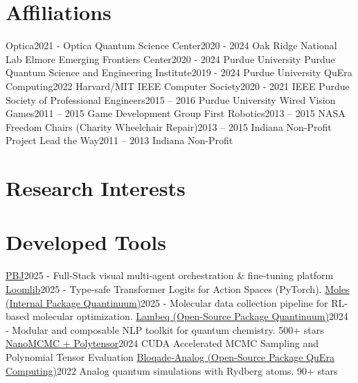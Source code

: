 \section{Affiliations}
  \resumeSubHeadingListStart
    \resumeSubheading
      {Optica}{2021 -}
      {Optica}{}
    \resumeSubheading
      {Quantum Science Center}{2020 - 2024}
      {Oak Ridge National Lab}{}
    \resumeSubheading
      {Elmore Emerging Frontiers Center}{2020 - 2024}
      {Purdue University}{}
    \resumeSubheading
      {Purdue Quantum Science and Engineering Institute}{2019 - 2024}
      {Purdue University}{}
    \resumeSubheading
      {QuEra Computing}{2022}
      {Harvard/MIT}{}
    \resumeSubheading
      {IEEE Computer Society}{2020 - 2021}
      {IEEE}{}
    \resumeSubheading
      {Purdue Society of Professional Engineers}{2015 – 2016}
      {Purdue University}{}
    \resumeSubheading
      {Wired Vision Games}{2011 – 2015}
      {Game Development Group}{}
    \resumeSubheading
      {First Robotics}{2013 – 2015}
      {NASA}{}
    \resumeSubheading
      {Freedom Chairs (Charity Wheelchair Repair)}{2013 – 2015}
      {Indiana Non-Profit}{}
    \resumeSubheading
      {Project Lead the Way}{2011 – 2013}
      {Indiana Non-Profit}{}
  \resumeSubHeadingListEnd
\section{Research Interests}
  \resumeSubHeadingListStart
  \resumeSubHeadingListEnd
\section{Developed Tools}
  \resumeSubHeadingListStart
    \resumeSubheading
      {\href{https://pbj-model-builder.vercel.app/}{PBJ}}{2025 -}
      {Full-Stack visual multi-agent orchestration \& fine-tuning platform}{}
    \resumeSubheading
      {\href{https://github.com/btrainwilson/loom}{Loomlib}}{2025 -}
      {Type-safe Transformer Logits for Action Spaces (PyTorch).}{}
    \resumeSubheading
      {\href{https://www.quantinuum.com/products-solutions/inquanto}{Moles (Internal Package Quantinuum)}}{2025 -}
      {Molecular data collection pipeline for RL-based molecular optimization.}{}
    \resumeSubheading
      {\href{https://github.com/Quantinuum/lambeq}{Lambeq (Open-Source Package Quantinuum)}}{2024 -}
      {Modular and composable NLP toolkit for quantum chemistry. 500+ stars}{}
    \resumeSubheading
      {\href{https://github.com/Btrainwilson/polytensor}{NanoMCMC + Polytensor}}{2024}
      {CUDA Accelerated MCMC Sampling and Polynomial Tensor Evaluation}{}
    \resumeSubheading
      {\href{https://github.com/QuEraComputing/bloqade-analog}{Bloqade-Analog (Open-Source Package QuEra Computing)}}{2022}
      {Analog quantum simulations with Rydberg atoms. 90+ stars}{}
  \resumeSubHeadingListEnd
